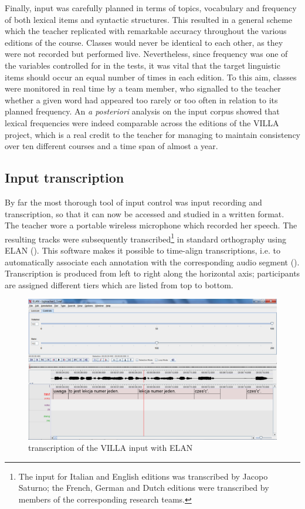 Finally, input was carefully planned in terms of topics, vocabulary and frequency of both lexical items and syntactic structures. This resulted in a general scheme which the teacher replicated with remarkable accuracy throughout the various editions of the course. Classes would never be identical to each other, as they were not recorded but performed live. Nevertheless, since frequency was one of the variables controlled for in the tests, it was vital that the target linguistic items should occur an equal number of times in each edition. To this aim, classes were monitored in real time by a team member, who signalled to the teacher whether a given word had appeared too rarely or too often in relation to its planned frequency. An \textit{a posteriori} analysis on the input corpus showed that lexical frequencies were indeed comparable across the editions of the VILLA project, which is a real credit to the teacher for managing to maintain consistency over ten different courses and a time span of almost a year.

\subsection{Input transcription}\label{sec:02:1.2}

By far the most thorough tool of input control was input recording and transcription, so that it can now be accessed and studied in a written format. The teacher wore a portable wireless microphone which recorded her speech. The resulting tracks were subsequently transcribed\footnote{The input for Italian and English editions was transcribed by Jacopo Saturno; the French, German and Dutch editions were  transcribed by members of the corresponding research teams.} in standard orthography using ELAN (\citealt{BrugmanRussell2004}). This software makes it possible to time-align transcriptions, i.e. to automatically associate each annotation with the corresponding audio segment (). Transcription is produced from left to right along the horizontal axis; participants are assigned different tiers which are listed from top to bottom.

\begin{figure}
    \includegraphics[width=\textwidth]{figures/02-3.pdf}
    \caption{transcription of the VILLA input with ELAN}
    \label{fig:02:3}
\end{figure}

